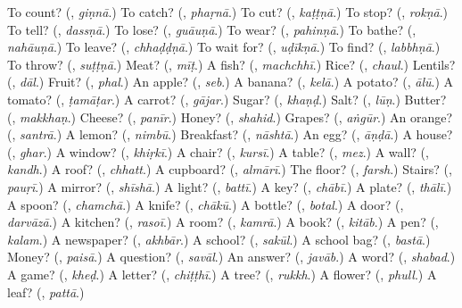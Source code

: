 \begin{tcolorbox}[breakable,colback=teal!4,colframe=teal!35!black,title={Before you move on}]
To count? (\textbf{}, \emph{giṇnā}.) To catch? (\textbf{}, \emph{phaṛnā}.) To cut? (\textbf{}, \emph{kaṭṭṇā}.) To stop? (\textbf{}, \emph{rokṇā}.) To tell? (\textbf{}, \emph{dassṇā}.) To lose? (\textbf{}, \emph{guāuṇā}.) To wear? (\textbf{}, \emph{pahinṇā}.) To bathe? (\textbf{}, \emph{nahāuṇā}.) To leave? (\textbf{}, \emph{chhaḍḍṇā}.) To wait for? (\textbf{}, \emph{uḍīkṇā}.) To find? (\textbf{}, \emph{labbhṇā}.) To throw? (\textbf{}, \emph{suṭṭṇā}.) Meat? (\textbf{}, \emph{mīṭ}.) A fish? (\textbf{}, \emph{machchhī}.) Rice? (\textbf{}, \emph{chaul}.) Lentils? (\textbf{}, \emph{dāl}.) Fruit? (\textbf{}, \emph{phal}.) An apple? (\textbf{}, \emph{seb}.) A banana? (\textbf{}, \emph{kelā}.) A potato? (\textbf{}, \emph{ālū}.) A tomato? (\textbf{}, \emph{ṭamāṭar}.) A carrot? (\textbf{}, \emph{gājar}.) Sugar? (\textbf{}, \emph{khaṇḍ}.) Salt? (\textbf{}, \emph{lūṇ}.) Butter? (\textbf{}, \emph{makkhaṇ}.) Cheese? (\textbf{}, \emph{panīr}.) Honey? (\textbf{}, \emph{shahid}.) Grapes? (\textbf{}, \emph{aṅgūr}.) An orange? (\textbf{}, \emph{santrā}.) A lemon? (\textbf{}, \emph{nimbū}.) Breakfast? (\textbf{}, \emph{nāshtā}.) An egg? (\textbf{}, \emph{āṇḍā}.) A house? (\textbf{}, \emph{ghar}.) A window? (\textbf{}, \emph{khiṛkī}.) A chair? (\textbf{}, \emph{kursī}.) A table? (\textbf{}, \emph{mez}.) A wall? (\textbf{}, \emph{kandh}.) A roof? (\textbf{}, \emph{chhatt}.) A cupboard? (\textbf{}, \emph{almārī}.) The floor? (\textbf{}, \emph{farsh}.) Stairs? (\textbf{}, \emph{pauṛī}.) A mirror? (\textbf{}, \emph{shīshā}.) A light? (\textbf{}, \emph{battī}.) A key? (\textbf{}, \emph{chābī}.) A plate? (\textbf{}, \emph{thālī}.) A spoon? (\textbf{}, \emph{chamchā}.) A knife? (\textbf{}, \emph{chākū}.) A bottle? (\textbf{}, \emph{botal}.) A door? (\textbf{}, \emph{darvāzā}.) A kitchen? (\textbf{}, \emph{rasoī}.) A room? (\textbf{}, \emph{kamrā}.) A book? (\textbf{}, \emph{kitāb}.) A pen? (\textbf{}, \emph{kalam}.) A newspaper? (\textbf{}, \emph{akhbār}.) A school? (\textbf{}, \emph{sakūl}.) A school bag? (\textbf{}, \emph{bastā}.) Money? (\textbf{}, \emph{paisā}.) A question? (\textbf{}, \emph{savāl}.) An answer? (\textbf{}, \emph{javāb}.) A word? (\textbf{}, \emph{shabad}.) A game? (\textbf{}, \emph{kheḍ}.) A letter? (\textbf{}, \emph{chiṭṭhī}.) A tree? (\textbf{}, \emph{rukkh}.) A flower? (\textbf{}, \emph{phull}.) A leaf? (\textbf{}, \emph{pattā}.)
\end{tcolorbox}
